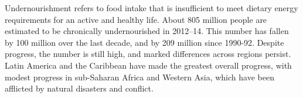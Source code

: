 Undernourishment refers to food intake that is insufficient to meet dietary energy requirements for an active and healthy life. About 805 million people are estimated to be chronically undernourished in 2012–14. This number has fallen by 100 million over the last decade, and by 209 million since 1990-92. Despite progress, the number is still high, and marked differences across regions persist. Latin America and the Caribbean have made the greatest overall progress, with modest progress in sub-Saharan Africa and Western Asia, which have been afflicted by natural disasters and conflict.
